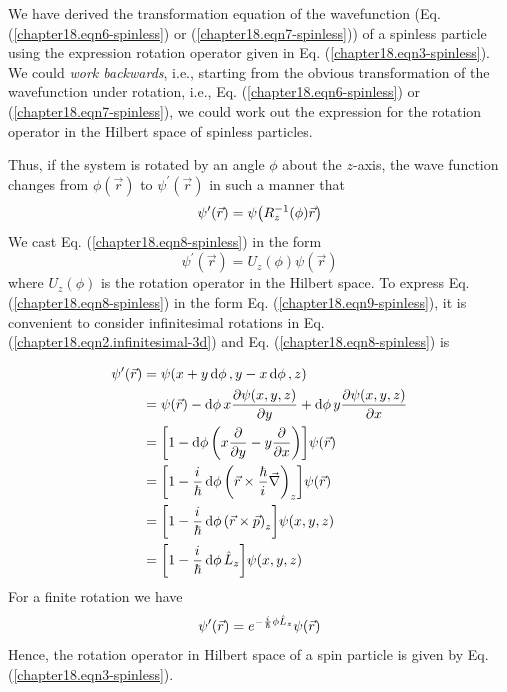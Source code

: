 We have derived the transformation equation of the wavefunction (Eq. (\ref{chapter18.eqn6-spinless}) or (\ref{chapter18.eqn7-spinless})) of a spinless particle using the expression rotation operator given in Eq. (\ref{chapter18.eqn3-spinless}). We could \textit{work backwards}, i.e., starting from the obvious transformation of the wavefunction under rotation, i.e., Eq. (\ref{chapter18.eqn6-spinless}) or (\ref{chapter18.eqn7-spinless}),  we could work out the expression for the rotation operator in the Hilbert space of spinless particles.


Thus, if the system is rotated by an angle $\phi$ about the $z$-axis, the wave function changes from $\phi(\vec{r})$ to $\psi^\prime(\vec{r})$ in such a manner that
\begin{equation}
\label{chapter18.eqn8-spinless}
	\psi^\prime(\vec{r}) = \psi\qty(R^{-1}_z(\phi) \vec{r})
\end{equation}
We cast Eq. (\ref{chapter18.eqn8-spinless}) in the form
\begin{equation}
\label{chapter18.eqn9-spinless}
	\psi^\prime(\vec{r}) = U_z(\phi) \psi(\vec{r})
\end{equation}
where $U_z(\phi)$ is the rotation operator in the Hilbert space. To express Eq. (\ref{chapter18.eqn8-spinless}) in the form Eq. (\ref{chapter18.eqn9-spinless}), it is convenient to consider infinitesimal rotations in Eq. (\ref{chapter18.eqn2.infinitesimal-3d}) and Eq. (\ref{chapter18.eqn8-spinless}) is

\begin{align*}
\psi^\prime(\vec{r}) 
&= \psi(x + y\dd{\phi}, y - x\dd{\phi}, z) \\
&= \psi\qty(\vec{r}) - \dd{\phi} x \pdv{\psi(x,y,z)}{y} + \dd{\phi} y \pdv{\psi(x,y,z)}{x} \\
&= \qty[1 - \dd{\phi} \qty(x \pdv{}{y} - y \pdv{}{x})] \psi\qty(\vec{r}) \\
&= \qty[1 - \frac{{i\mkern1mu}}{\hbar} \dd{\phi} \qty(\vec{r} \times \frac{\hbar}{{i\mkern1mu}} \vec{\nabla})_z] \psi\qty(\vec{r}) \\
&= \qty[1 - \frac{{i\mkern1mu}}{\hbar} \dd{\phi} \qty(\vec{r} \times \vec{p})_z] \psi(x,y,z) \\
&= \qty[1 - \frac{{i\mkern1mu}}{\hbar} \dd{\phi} \hat{L}_z] \psi(x,y,z)
\end{align*}
For a finite rotation we have
\begin{equation}
\label{chapter18.eqn11-spinless}
\psi^\prime(\vec{r}) = e^{-\frac{{i\mkern1mu}}{\hbar} \phi \hat{L}_z}  \psi(\vec{r})
\end{equation}
Hence, the rotation operator in Hilbert space  of a spin particle is given by Eq. (\ref{chapter18.eqn3-spinless}).




